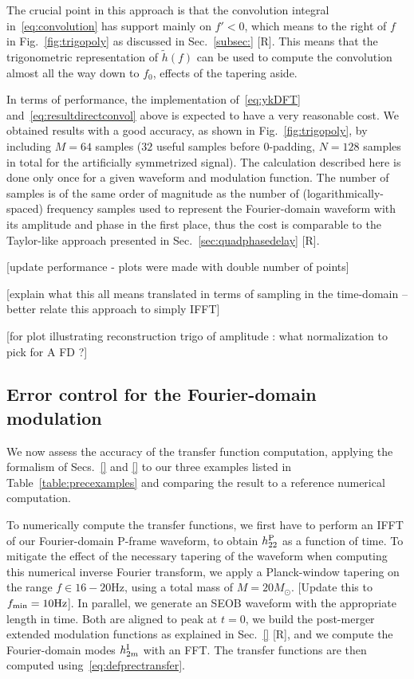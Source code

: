 \documentclass[aps,showpacs,twocolumn,
prd,superscriptaddress,nofootinbib]{revtex4-1}
\newcommand{\Msol}{M_{\odot}}
\newcommand{\SM}[1]{{\color{Red} #1}}
\begin{document}
The crucial point in this approach is that the convolution integral in~\eqref{eq:convolution} has support mainly on $f'<0$, which means to the right of $f$ in Fig.~\ref{fig:trigopoly} as discussed in Sec.~\ref{subsec:} \SM{[R]}. This means that the trigonometric representation of $\tilde{h}(f)$ can be used to compute the convolution almost all the way down to $f_{0}$, effects of the tapering aside.

In terms of performance, the implementation of~\eqref{eq:ykDFT} and~\eqref{eq:resultdirectconvol} above is expected to have a very reasonable cost. We obtained results with a good accuracy, as shown in Fig.~\ref{fig:trigopoly}, by including $M=64$ samples ($32$ useful samples before 0-padding, $N=128$ samples in total for the artificially symmetrized signal). The calculation described here is done only once for a given waveform and modulation function. The number of samples is of the same order of magnitude as the number of (logarithmically-spaced) frequency samples used to represent the Fourier-domain waveform with its amplitude and phase in the first place, thus the cost is comparable to the Taylor-like approach presented in Sec.~\ref{sec:quadphasedelay} \SM{[R]}.

\SM{[update performance - plots were made with double number of points]}

\SM{[explain what this all means translated in terms of sampling in the time-domain -- better relate this approach to simply IFFT]}

\SM{[for plot illustrating reconstruction trigo of amplitude : what normalization to pick for A FD ?]}


\subsection{Error control for the Fourier-domain modulation}
\label{subsec:errorsPrec}

We now assess the accuracy of the transfer function computation, applying the formalism of Secs.~\ref{} and \ref{} to our three examples listed in Table~\ref{table:precexamples} and comparing the result to a reference numerical computation.

To numerically compute the transfer functions, we first have to perform an IFFT of our Fourier-domain P-frame waveform, to obtain $h^{\rm P}_{22}$ as a function of time. To mitigate the effect of the necessary tapering of the waveform when computing this numerical inverse Fourier transform, we apply a Planck-window tapering on the range $f\in 16-20 \text{Hz}$, using a total mass of $M=20 \Msol$. \SM{[Update this to $f_{\rm min} = 10\text{Hz}$]}. In parallel, we generate an SEOB waveform with the appropriate length in time. Both are aligned to peak at $t=0$, we build the post-merger extended modulation functions as explained in Sec.~\ref{} \SM{[R]}, and we compute the Fourier-domain modes $h^{\rm I}_{2m}$ with an FFT. The transfer functions are then computed using~\eqref{eq:defprectransfer}.
\end{document}
